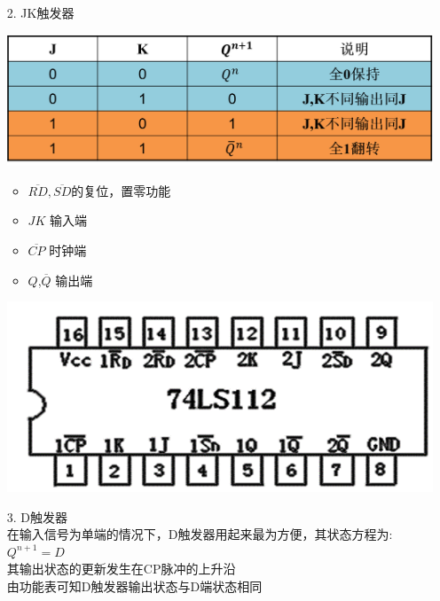 \documentclass[UTF8]{ctexart}
\begin{document}
\begin{enumerate}
\begin{itemize}
                  \item [2.] JK触发器 \\
                        \begin{center}
                              \includegraphics[scale = 0.6]{3.png}
                              \label{fig:label}
                        \end{center}

                        \begin{itemize}
                              \item $\overline{RD},\overline{SD}$的复位，置零功能
                              \item $JK$ 输入端
                              \item $\overline{CP}$ 时钟端
                              \item $Q$,$\overline{Q}$ 输出端
                        \end{itemize}
                        \begin{center}
                              \includegraphics[scale = 0.6]{4.png}
                              \label{fig:label}
                        \end{center}

                  \item [3.] D触发器  \\
                        在输入信号为单端的情况下，D触发器用起来最为方便，其状态方程为:$Q^{n+1} = D$\\
                        其输出状态的更新发生在CP脉冲的上升沿\\
                        由功能表可知D触发器输出状态与D端状态相同\\
                        \begin{itemize}


\end{itemize}
\end{itemize}
\end{enumerate}
\end{document}
